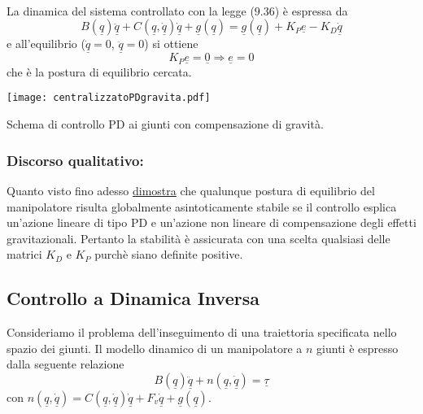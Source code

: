 \paragraph{}
La dinamica del sistema controllato con la legge ($9.36$) è espressa da
\begin{equation}
	B(\underline{q})\underline{\ddot{q}} + C(\underline{q}, \underline{\dot{q}})\underline{\dot{q}} + \underline{g}(\underline{q}) = \underline{g}(\underline{q}) + K_P \underline{e} - K_D \underline{\dot{q}}
\end{equation}
e all'equilibrio ($\underline{\dot{q}} = 0$, $\underline{\ddot{q}} = 0$) si ottiene
\begin{equation}
	K_P \underline{e} = \underline{0} \Rightarrow \underline{e} = 0
\end{equation}
che è la postura di equilibrio cercata.

\begin{center}
	\texttt{[image: centralizzatoPDgravita.pdf]}
	\caption{Schema di controllo PD ai giunti con compensazione di gravità.}
\end{center}

\subsubsection{Discorso qualitativo:}
Quanto visto fino adesso \underline{dimostra} che qualunque postura di equilibrio del manipolatore risulta globalmente asintoticamente stabile se il controllo esplica un'azione lineare di tipo PD e un'azione non lineare di compensazione degli effetti gravitazionali. Pertanto la stabilità è assicurata con una scelta qualsiasi delle matrici $K_D$ e $K_P$ purchè siano definite positive.

\subsection{Controllo a Dinamica Inversa}
Consideriamo il problema dell'inseguimento di una traiettoria specificata nello spazio dei giunti. Il modello dinamico di un manipolatore a $n$ giunti è espresso dalla seguente relazione
\begin{equation}
	B(\underline{q})\underline{\ddot{q}} + n(\underline{q}, \underline{\dot{q}}) = \underline{\tau}
\end{equation}
con $n(\underline{q}, \underline{\dot{q}}) = C(\underline{q}, \underline{\dot{q}})\underline{\dot{q}} + F_v \underline{\dot{q}} + \underline{g}(\underline{q})$.

